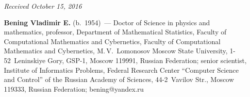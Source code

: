 \vspace*{-3pt}

\hfill{\small\textit{Received October 15, 2016}}

\Contrl

\noindent
\textbf{Bening Vladimir E.} (b.\ 1954)~---
Doctor of Science in physics and mathematics, professor, Department of Mathematical 
Statistics, Faculty of Computational Mathematics and Cybernetics, 
Faculty of Computational Mathematics and Cybernetics, 
M.\,V.~Lomonosov Moscow State University, 1-52~Leninskiye Gory, GSP-1, 
Moscow 119991, Russian Federation; senior scientist,
Institute of Informatics Problems, Federal Research Center ``Computer Science 
and Control'' of the Russian Academy of Sciences, 44-2~Vavilov Str., Moscow 119333,  
Russian Federation; \mbox{bening@yandex.ru}
\label{end\stat}


\renewcommand{\bibname}{\protect\rm Литература} 